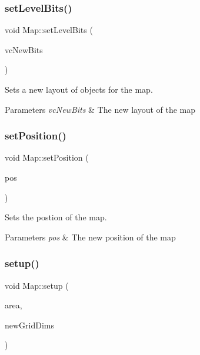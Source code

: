 \subsubsection{\texorpdfstring{set\+Level\+Bits()}{setLevelBits()}}
{\footnotesize\ttfamily void Map\+::set\+Level\+Bits (\begin{DoxyParamCaption}\item[{std\+::vector$<$ std\+::vector$<$ char $>$$>$}]{vc\+New\+Bits }\end{DoxyParamCaption})}



Sets a new layout of objects for the map. 


\begin{DoxyParams}{Parameters}
{\em vc\+New\+Bits} & The new layout of the map \\
\hline
\end{DoxyParams}
\mbox{\label{class_map_a4d063b1781e9e617e6718bbe73b293c6}} 
\subsubsection{\texorpdfstring{set\+Position()}{setPosition()}}
{\footnotesize\ttfamily void Map\+::set\+Position (\begin{DoxyParamCaption}\item[{sf\+::\+Vector2f}]{pos }\end{DoxyParamCaption})}



Sets the postion of the map. 


\begin{DoxyParams}{Parameters}
{\em pos} & The new position of the map \\
\hline
\end{DoxyParams}
\mbox{\label{class_map_a8a7a32583dd82811cc7235b70609ab27}} 
\subsubsection{\texorpdfstring{setup()}{setup()}}
{\footnotesize\ttfamily void Map\+::setup (\begin{DoxyParamCaption}\item[{sf\+::\+Float\+Rect}]{area,  }\item[{sf\+::\+Vector2f}]{new\+Grid\+Dims }\end{DoxyParamCaption})}



